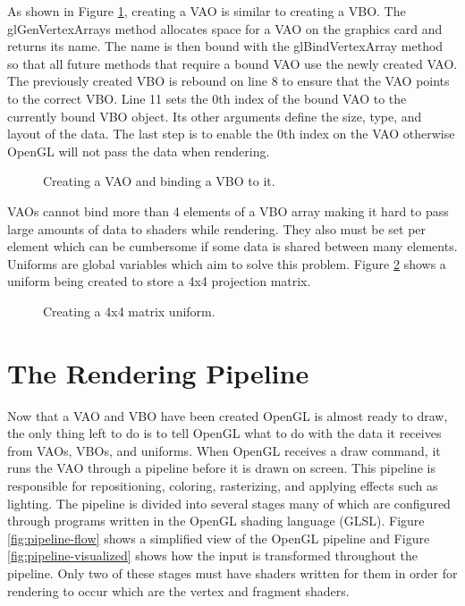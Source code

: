 \documentclass{article}
\begin{document}
As shown in Figure \ref{fig:create-vao}, creating a VAO is similar to creating a VBO. The glGenVertexArrays method allocates space for a VAO on the graphics card and returns its name. The name is then bound with the glBindVertexArray method so that all future methods that require a bound VAO use the newly created VAO. The previously created VBO is rebound on line 8 to ensure that the VAO points to the correct VBO. Line 11 sets the 0th index of the bound VAO to the currently bound VBO object. Its other arguments define the size, type, and layout of the data. The last step is to enable the 0th index on the VAO otherwise OpenGL will not pass the data when rendering.

\begin{figure}[h]
	
	\caption{Creating a VAO and binding a VBO to it.}
	\label{fig:create-vao}
\end{figure}

VAOs cannot bind more than 4 elements of a VBO array making it hard to pass large amounts of data to shaders while rendering. They also must be set per element which can be cumbersome if some data is shared between many elements. Uniforms are global variables which aim to solve this problem. Figure \ref{fig:matrix-uniform} shows a uniform being created to store a 4x4 projection matrix.

\begin{figure}[h]
	
	\caption{Creating a 4x4 matrix uniform.}
	\label{fig:matrix-uniform}
\end{figure}

\section{The Rendering Pipeline}
Now that a VAO and VBO have been created OpenGL is almost ready to draw, the only thing left to do is to tell OpenGL what to do with the data it receives from VAOs, VBOs, and uniforms. When OpenGL receives a draw command, it runs the VAO through a pipeline before it is drawn on screen. This pipeline is responsible for repositioning, coloring, rasterizing, and applying effects such as lighting. The pipeline is divided into several stages many of which are configured through programs written in the OpenGL shading language (GLSL). Figure \ref{fig:pipeline-flow} shows a simplified view of the OpenGL pipeline and Figure \ref{fig:pipeline-visualized} shows how the input is transformed throughout the pipeline. Only two of these stages must have shaders written for them in order for rendering to occur which are the vertex and fragment shaders.
\end{document}
